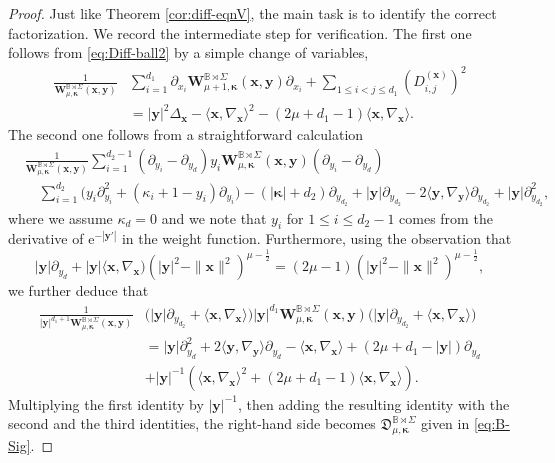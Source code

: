 \documentclass{amsart}
\theoremstyle{remark}
\def\la{{\langle}}
\def\ra{{\rangle}}
\def\e{\mathrm{e}}
\def\fD{{\mathfrak D}}
\def\k{{\kappa}}
\def\la{{\langle}}
\def\ra{{\rangle}}
\def\xb{{\bm x}}
\def\yb{{\bm y}}
\def\Wb{{\bm W}}
\def\BB{{\mathbb B}}
\def\bk{{\boldsymbol{\kappa}}}
\def\f{\frac}
\begin{document}
\begin{proof}
Just like Theorem \ref{cor:diff-eqnV}, the main task is to identify the correct factorization. We record the intermediate step for
verification. The first one follows from \eqref{eq:Diff-ball2} by a simple change of variables,
\begin{align*}
  \frac{1}{\bm W_{\mu,\bk}^{\BB\rtimes\Sigma}(\bm x, \bm y)}   
&    \sum_{i=1}^{d_1} \partial_{x_i} \bm W_{\mu+1,\bk}^{\BB\rtimes \Sigma}(\bm x, \bm y) \partial_{x_i} 
   +  \sum_{1 \le i< j \le d_1} \left(D_{i,j}^{(\bm x)}\right)^2 \\
& =    |\bm y|^2 \Delta_{\bm x} -  \la \bm x, \nabla_{\bm x} \ra^2 - (2\mu + d_1 -1) \la \bm x, \nabla_{\bm x} \ra.
\end{align*}
The second one follows from a straightforward calculation 
\begin{align*}
 &  \frac{1}{\Wb_{\mu,\bk}^{\BB\rtimes \Sigma} (\xb,\yb)}  \sum_{i=1}^{d_2-1} (\partial_{y_i} - \partial_{y_d}) 
       y_i  \Wb_{\mu,\bk}^{\BB\rtimes \Sigma} (\xb,\yb)  (\partial_{y_i} - \partial_{y_d})   \\
  & \quad \sum_{i=1}^{d_2} \big( y_i \partial_{y_i}^2 + (\k_i+1-y_i) \partial_{y_i} \big) -( |\bk|+d_2) \partial_{y_{d_2}} +|\yb|\partial_{y_{d_2}}
      -2 \la \yb, \nabla_{\yb} \ra \partial_{y_{d_2}} + |\yb| \partial_{y_{d_2}}^2,
\end{align*}
where we assume $\k_d =0$ and we note that $y_i$ for $1 \le i \le d_2-1$ comes from the derivative of $\e^{-|\yb'|}$ in the 
weight function. Furthermore, using the observation that 
$$
  |\yb| \partial_{y_d} + |\yb| \la \xb,\nabla_\xb) (|\yb|^2 - \|\xb\|^2)^{\mu-\f12} = (2 \mu -1) (|\yb|^2 - \|\xb\|^2)^{\mu-\f12},
$$
we further deduce that 
\begin{align*}
  \frac{1}{|\yb|^{d_1+1} \Wb_{\mu,\bk}^{\BB\rtimes \Sigma} (\xb,\yb)}
   &  \big(|\yb| \partial_{y_{d_2}} +\la \xb, \nabla_{\xb}\ra \big) |\yb|^{d_1}
              \Wb_{\mu,\bk}^{\BB\rtimes \Sigma} (\xb,\yb) \big(|\yb| \partial_{y_{d_2}} + \la \xb, \nabla_{\xb}\ra \big) \\
     & = |\yb| \partial_{y_d}^2 + 2 \la \yb, \nabla_{\yb} \ra \partial_{y_d} - \la \xb, \nabla_{\xb} \ra 
       + (2\mu + d_1 -|\yb|) \partial_{y_d} \\
     & + |\yb|^{-1} \left(\la \bm x, \nabla_{\bm x} \ra^2+(2\mu + d_1 -1) \la \bm x, \nabla_{\bm x} \ra \right).
\end{align*}
Multiplying the first identity by $|\yb|^{-1}$, then adding the resulting identity with the second and the third identities, 
the right-hand side becomes $ \fD_{\mu,\bk}^{\BB\rtimes \Sigma}$ given in \eqref{eq:B-Sig}. 
\end{proof}
\end{document}
